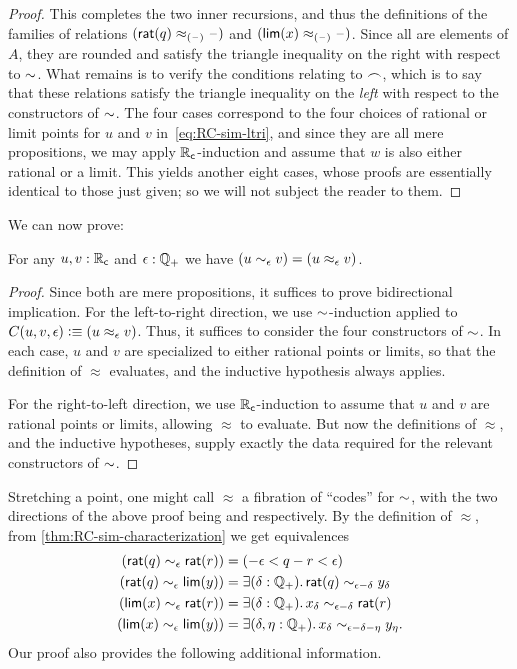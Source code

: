 \begin{proof}
  This completes the two inner recursions, and thus the definitions of the families of relations $(\mathsf{rat}(q)\approx_{(\mathord{\hspace{1pt}\text{--}\hspace{1pt}})}\mathord{\hspace{1pt}\text{--}\hspace{1pt}})$ and $(\mathsf{lim}(x)\approx_{(\mathord{\hspace{1pt}\text{--}\hspace{1pt}})}\mathord{\hspace{1pt}\text{--}\hspace{1pt}})$.
  Since all are elements of $A$, they are rounded and satisfy the triangle inequality on the right with respect to $\mathord\sim$.
  What remains is to verify the conditions relating to $\frown$, which is to say that these relations satisfy the triangle inequality on the \emph{left} with respect to the constructors of $\mathord\sim$.
  The four cases correspond to the four choices of rational or limit points for $u$ and $v$ in~\eqref{eq:RC-sim-ltri}, and since they are all mere propositions, we may apply $\mathbb{R}_\mathsf{c}$-induction and assume that $w$ is also either rational or a limit.
  This yields another eight cases, whose proofs are essentially identical to those just given; so we will not subject the reader to them.
\end{proof}

We can now prove:

\begin{thm}\label{thm:RC-sim-characterization}
  For any $u,v:\mathbb{R}_\mathsf{c}$ and $\epsilon:\mathbb{Q}_{+}$ we have $(u\sim_{\epsilon} v) = (u\approx_\epsilon v)$.
\end{thm}
\begin{proof}
  Since both are mere propositions, it suffices to prove bidirectional implication.
  For the left-to-right direction, we use $\mathord\sim$-induction applied to $C(u,v,\epsilon)\vcentcolon\equiv (u\approx_\epsilon v)$.
  Thus, it suffices to consider the four constructors of $\mathord\sim$.
  In each case, $u$ and $v$ are specialized to either rational points or limits, so that the definition of $\approx$ evaluates, and the inductive hypothesis always applies.

  For the right-to-left direction, we use $\mathbb{R}_\mathsf{c}$-induction to assume that $u$ and $v$ are rational points or limits, allowing $\approx$ to evaluate.
  But now the definitions of $\approx$, and the inductive hypotheses, supply exactly the data required for the relevant constructors of $\mathord\sim$.
\end{proof}

Stretching a point, one might call $\approx$ a fibration of ``codes'' for $\mathord\sim$, with the two directions of the above proof being \encode and \decode respectively.
By the definition of $\approx$, from \autoref{thm:RC-sim-characterization} we get equivalences
\begin{align*}
  (\rcrat(q) \close\epsilon \rcrat(r))  &=
  (-\epsilon < q - r < \epsilon)\\
  (\rcrat(q) \close\epsilon \rclim(y)) &=
  \exis{\delta : \Qp} \rcrat(q) \close{\epsilon - \delta} y_\delta\\
  (\rclim(x) \close\epsilon \rcrat(r)) &=
  \exis{\delta : \Qp} x_\delta \close{\epsilon - \delta} \rcrat(r)\\
  (\rclim(x) \close\epsilon \rclim(y)) &=
  \exis{\delta, \eta : \Qp} x_\delta \close{\epsilon - \delta - \eta} y_\eta.
\end{align*}
Our proof also provides the following additional information.

